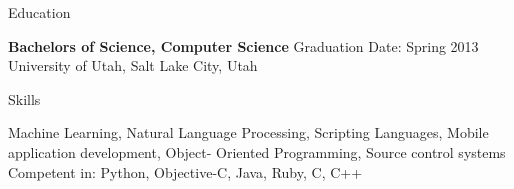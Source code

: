 \documentclass{resume}
\begin{document}
\begin{rSection}{Education}

{\bf Bachelors of Science, Computer Science} \hfill {Graduation Date: Spring 2013} \\ 
University of Utah, Salt Lake City, Utah

\end{rSection}


\begin{skills}
\begin{rSection}{Skills}

Machine Learning, Natural Language Processing, Scripting Languages, Mobile application development, Object- Oriented Programming, Source control systems \\
Competent in: Python, Objective-C, Java, Ruby, C, C++

\end{rSection}
\end{skills}

\end{document}
